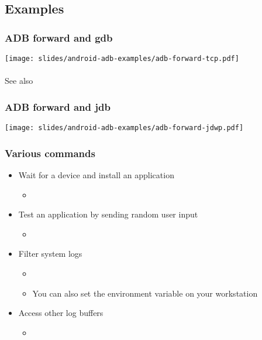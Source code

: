 \subsection{Examples}
\begin{frame}
  \frametitle{ADB forward and gdb}
  \begin{center}
    \texttt{[image: slides/android-adb-examples/adb-forward-tcp.pdf]}\\
    \\
    See also 
  \end{center}
\end{frame}

\begin{frame}
  \frametitle{ADB forward and jdb}
  \begin{center}
    \texttt{[image: slides/android-adb-examples/adb-forward-jdwp.pdf]}\\
  \end{center}
\end{frame}

\begin{frame}
  \frametitle{Various commands}
  \begin{itemize}
  \item Wait for a device and install an application
    \begin{itemize}
    \item {}
    \end{itemize}
  \item Test an application by sending random user input
    \begin{itemize}
    \item {}
    \end{itemize}
  \item Filter system logs
    \begin{itemize}
    \item {}
    \item You can also set the  environment
      variable on your workstation
    \end{itemize}
  \item Access other log buffers
    \begin{itemize}
    \item {}
    \end{itemize}
  \end{itemize}
\end{frame}
